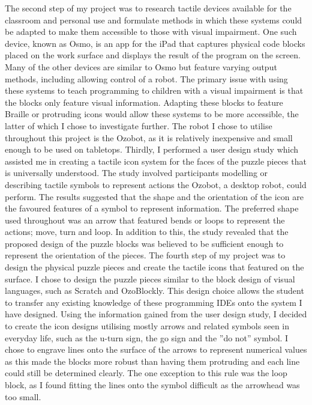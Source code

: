 \documentclass[oneside,%
                    author={Malak Hajji},
                    degree={BSc},
                    title={Designing An Accessible Computational Toolkit For Students},
                  subtitle={With Mixed Visual Abilities}]{dissertation}
\begin{document}
The second step of my project was to research tactile devices available for the classroom and personal use and formulate methods in which these systems could be adapted to make them accessible to those with visual impairment. One such device, known as Osmo, is an app for the iPad that captures physical code blocks placed on the work surface and displays the result of the program on the screen. Many of the other devices are similar to Osmo but feature varying output methods, including allowing control of a robot. The primary issue with using these systems to teach programming to children with a visual impairment is that the blocks only feature visual information. Adapting these blocks to feature Braille or protruding icons would allow these systems to be more accessible, the latter of which I chose to investigate further. The robot I chose to utilise throughout this project is the Ozobot, as it is relatively inexpensive and small enough to be used on tabletops.
Thirdly, I performed a user design study which assisted me in creating a tactile icon system for the faces of the puzzle pieces that is universally understood. The study involved participants modelling or describing tactile symbols to represent actions the Ozobot, a desktop robot, could perform. The results suggested that the shape and the orientation of the icon are the favoured features of a symbol to represent information. The preferred shape used throughout was an arrow that featured bends or loops to represent the actions; move, turn and loop. In addition to this, the study revealed that the proposed design of the puzzle blocks was believed to be sufficient enough to represent the orientation of the pieces.
The fourth step of my project was to design the physical puzzle pieces and create the tactile icons that featured on the surface. I chose to design the puzzle pieces similar to the block design of visual languages, such as Scratch and OzoBlockly. This design choice allows the student to transfer any existing knowledge of these programming IDEs onto the system I have designed. Using the information gained from the user design study, I decided to create the icon designs utilising mostly arrows and related symbols seen in everyday life, such as the u-turn sign, the go sign and the ”do not” symbol. I chose to engrave lines onto the surface of the arrows to represent numerical values as this made the blocks more robust than having them protruding and each line could still be determined clearly. The one exception to this rule was the loop block, as I found fitting the lines onto the symbol difficult as the arrowhead was too small.
\end{document}
